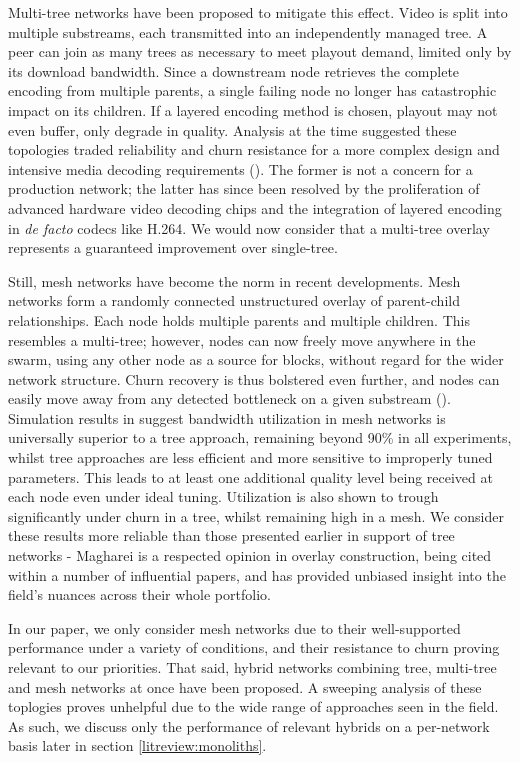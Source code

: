 \documentclass[12pt,a4paper]{article}
\begin{document}
Multi-tree networks have been proposed to mitigate this effect. Video is split into multiple substreams, each transmitted into an independently managed tree. A peer can join as many trees as necessary to meet playout demand, limited only by its download bandwidth. Since a downstream node retrieves the complete encoding from multiple parents, a single failing node no longer has catastrophic impact on its children. If a layered encoding method is chosen, playout may not even buffer, only degrade in quality. Analysis at the time suggested these topologies traded reliability and churn resistance for a more complex design and intensive media decoding requirements (\cite{Ghoshal2007}). The former is not a concern for a production network; the latter has since been resolved by the proliferation of advanced hardware video decoding chips and the integration of layered encoding in \textit{de facto} codecs like H.264. We would now consider that a multi-tree overlay represents a guaranteed improvement over single-tree.

Still, mesh networks have become the norm in recent developments. Mesh networks form a randomly connected unstructured overlay of parent-child relationships. Each node holds multiple parents and multiple children. This resembles a multi-tree; however, nodes can now freely move anywhere in the swarm, using any other node as a source for blocks, without regard for the wider network structure. Churn recovery is thus bolstered even further, and nodes can easily move away from any detected bottleneck on a given substream (\cite{Magharei2006}). Simulation results in \cite{Magharei2007} suggest bandwidth utilization in mesh networks is universally superior to a tree approach, remaining beyond 90\% in all experiments, whilst tree approaches are less efficient and more sensitive to improperly tuned parameters. This leads to at least one additional quality level being received at each node even under ideal tuning. Utilization is also shown to trough significantly under churn in a tree, whilst remaining high in a mesh. We consider these results more reliable than those presented earlier in support of tree networks - Magharei is a respected opinion in overlay construction, being cited within a number of influential papers, and has provided unbiased insight into the field's nuances across their whole portfolio.

In our paper, we only consider mesh networks due to their well-supported performance under a variety of conditions, and their resistance to churn proving relevant to our priorities. That said, hybrid networks combining tree, multi-tree and mesh networks at once have been proposed. A sweeping analysis of these toplogies proves unhelpful due to the wide range of approaches seen in the field. As such, we discuss only the performance of relevant hybrids on a per-network basis later in section \ref{litreview:monoliths}.
\end{document}
